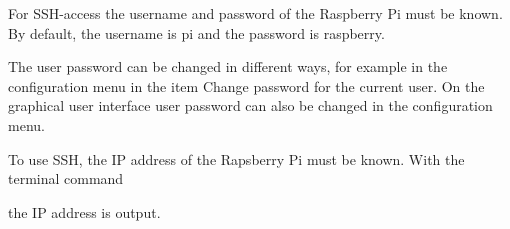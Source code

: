 For SSH-access the username and password of the Raspberry Pi must be known. By default, the username is \glqq pi\grqq{} and the password is
\glqq raspberry\grqq.



The user password can be changed in different ways, for example in the configuration menu 
in the item \glqq Change password for the current user\grqq{}. On the graphical user interface 
user password can also be changed in the configuration menu.



\bigskip

To use SSH, the IP address of the Rapsberry Pi must be known. With the terminal command

\medskip


\medskip

the IP address is output.
